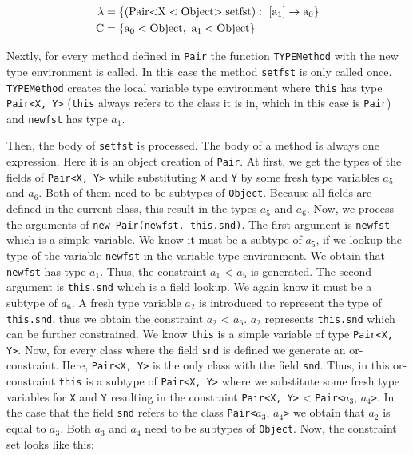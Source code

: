 \begin{align*}
    \lambda &= \{ ( \text{Pair} \text{<} \text{X} \vartriangleleft \text{Object} \text{>}. \text{setfst} ): \ [\text{a}_1] \to \text{a}_0 \}\\
    \text{C} &= \{ \text{a}_0 < \text{Object}, \ \text{a}_1 < \text{Object} \}\\
\end{align*}

Nextly, for every method defined in \verb|Pair| the function \verb|TYPEMethod| with the new type environment is called.
In this case the method \verb|setfst| is only called once. \verb|TYPEMethod| creates the local variable type environment where \verb|this| has type \verb|Pair<X, Y>| (\verb|this| always refers to the class it is in, which in this case is \verb|Pair|) and \verb|newfst| has type $a_1$.

Then, the body of \verb|setfst| is processed. The body of a method is always one expression. Here it is an object creation of \verb|Pair|.
At first, we get the types of the fields of \verb|Pair<X, Y>| while substituting \verb|X| and \verb|Y| by some fresh type variables $a_5$ and $a_6$. Both of them need to be subtypes of \verb|Object|. Because all fields are defined in the current class, this result in the types $a_5$ and $a_6$. Now, we process the arguments of \verb|new Pair(newfst, this.snd)|.
The first argument is \verb|newfst| which is a simple variable. We know it must be a subtype of $a_5$, if we lookup the type of the variable \verb|newfst| in the variable type environment. We obtain that \verb|newfst| has type $a_1$. Thus, the constraint $a_1$ < $a_5$ is generated.
The second argument is \verb|this.snd| which is a field lookup. We again know it must be a subtype of $a_6$. A fresh type variable $a_2$ is introduced to represent the type of \verb|this.snd|, thus we obtain the constraint $a_2$ < $a_6$.
$a_2$ represents \verb|this.snd| which can be further constrained. We know \verb|this| is a simple variable of type \verb|Pair<X, Y>|.
Now, for every class where the field \verb|snd| is defined we generate an or-constraint. Here, \verb|Pair<X, Y>| is the only class with the field \verb|snd|. Thus, in this or-constraint \verb|this| is a subtype of \verb|Pair<X, Y>| where we substitute some fresh type variables for \verb|X| and \verb|Y| resulting in the constraint \verb|Pair<X, Y>| < \verb|Pair<|$a_3$, $a_4$\verb|>|.
In the case that the field \verb|snd| refers to the class \verb|Pair<|$a_3$, $a_4$\verb|>| we obtain that $a_2$ is equal to $a_3$. Both $a_3$ and $a_4$ need to be subtypes of \verb|Object|.
Now, the constraint set looks like this:

